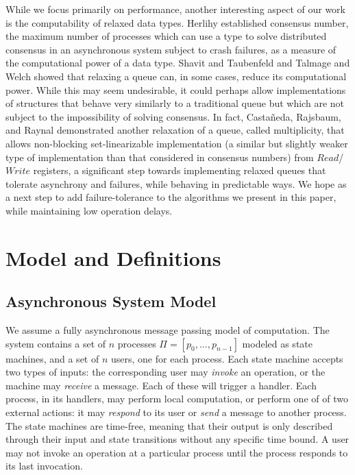 \documentclass[a4paper,anonymous,USenglish]{lipics-v2021}
\theoremstyle{definition}
\begin{document}
While we focus primarily on performance, another interesting aspect of our work is the computability of relaxed data types.  Herlihy \cite{Herlihy91} established consensus number, the maximum number of processes which can use a type to solve distributed consensus in an asynchronous system subject to crash failures, as a measure of the computational power of a data type.  Shavit and Taubenfeld \cite{ShavitTaubenfeld16} and Talmage and Welch \cite{TalmageWelch19} showed that relaxing a queue can, in some cases, reduce its computational power. While this may seem undesirable, it could perhaps allow implementations of structures that behave very similarly to a traditional queue but which are not subject to the impossibility of solving consensus.  In fact, Casta{\~n}eda, Rajsbaum, and Raynal \cite{CastanedaRajsbaumRaynal20} demonstrated another relaxation of a queue, called multiplicity, that allows non-blocking set-linearizable implementation (a similar but slightly weaker type of implementation than that considered in consensus numbers) from $Read$/$Write$ registers, a significant step towards implementing relaxed queues that tolerate asynchrony and failures, while behaving in predictable ways.  We hope as a next step to add failure-tolerance to the algorithms we present in this paper, while maintaining low operation delays.

\section{Model and Definitions}

\subsection{Asynchronous System Model}
We assume a fully asynchronous message passing model of computation.  The system contains a set of $n$ processes $\Pi = [p_0, \dots , p_{n-1}]$ modeled as state machines, and a set of $n$ users, one for each process.  Each state machine accepts two types of inputs: the corresponding user may \emph{invoke} an operation, or the machine may \emph{receive} a message.  Each of these will trigger a handler.  Each process, in its handlers, may perform local computation, or perform one of of two external actions: it may \emph{respond} to its user or \emph{send} a message to another process.  The state machines are time-free, meaning that their output is only described through their input and state transitions without any specific time bound.  A user may not invoke an operation at a particular process until the process responds to its last invocation.  
\end{document}
